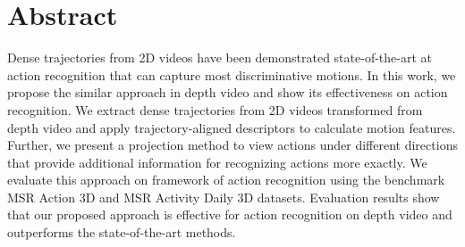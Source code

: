 ﻿\section{Abstract}
Dense trajectories from 2D videos have been demonstrated state-of-the-art at action recognition that can capture most discriminative motions.
In this work, we propose the similar approach in depth video and show its effectiveness on action recognition.
We extract dense trajectories from 2D videos transformed from depth video and apply trajectory-aligned descriptors to calculate motion features.
Further, we present a projection method to view actions under different directions that provide additional information for recognizing actions more exactly.
We evaluate this approach on framework of action recognition using the benchmark MSR Action 3D and MSR Activity Daily 3D datasets.
Evaluation results show that our proposed approach is effective for action recognition on depth video and outperforms the state-of-the-art methods.
